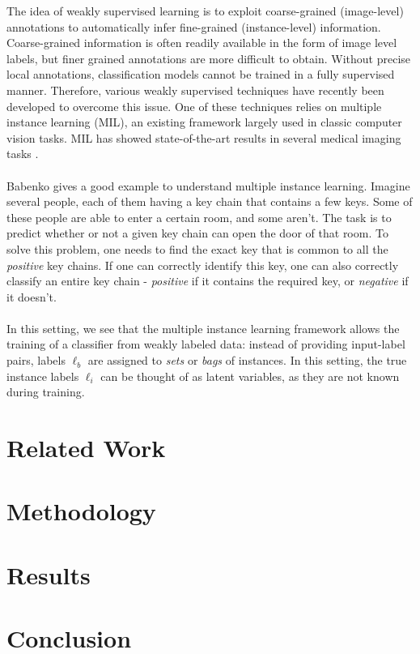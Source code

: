 \documentclass[final]{cvpr}
\begin{document}
	The idea of weakly supervised learning is to exploit coarse-grained (image-level) annotations to automatically infer fine-grained (instance-level) information. Coarse-grained information is often readily available in the form of image level labels, but finer grained annotations are more difficult to obtain. Without precise local annotations, classification models cannot be trained in a fully supervised manner. Therefore, various weakly supervised techniques have recently been developed to overcome this issue. One of these techniques relies on multiple instance learning (MIL), an existing framework largely used in classic computer vision tasks. MIL has showed state-of-the-art results in several medical imaging tasks \cite{hou_MIL}. \\
	\\
	Babenko \cite{mil} gives a good example to understand multiple instance learning. Imagine several people, each of them having a key chain that contains a few keys. Some of these people are able to enter a certain room, and some aren’t. The task is to predict whether or not a given key chain can open the door of that room. To solve this problem, one needs to find the exact key that is common to all the \textit{positive} key chains. If one can correctly identify this key, one can also correctly classify an entire key chain - \textit{positive} if it contains the required key, or \textit{negative} if it doesn't.\\
	\\
	In this setting, we see that the multiple instance learning framework allows the training of a classifier from weakly labeled data: instead of providing input-label pairs, labels $\ell_b$ are assigned to \emph{sets} or \emph{bags} of instances. In this setting, the true instance labels $\ell_i$ can be thought of as latent variables, as they are not known during training.
	
	\section{Related Work}
	
	\section{Methodology}
	
	\section{Results}
	
	\section{Conclusion}
	
	
	{\small
		
		
	}
\end{document}
